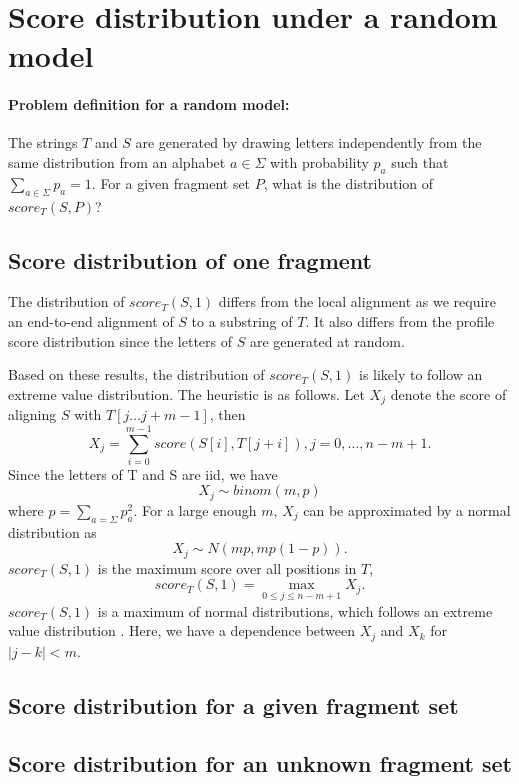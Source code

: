 \section{Score distribution under a random model}
\paragraph{Problem definition for a random model:}
The strings $T$ and $S$ are generated by drawing letters independently
from the same distribution from an alphabet $a \in \Sigma$ with
probability $p_a$ such that $\sum_{a \in \Sigma} p_a = 1$.
For a given fragment set $P$, what is the distribution of $score_T(S,
P)$?


\subsection{Score distribution of one fragment}
The distribution of $score_T(S,1)$ differs from the local alignment as
we require an end-to-end alignment of $S$ to a substring of $T$. It also
differs from the profile score distribution since the letters of $S$ are
generated at random.

Based on these results, the distribution of $score_T(S,1)$ is likely to
follow an extreme value distribution. The heuristic is as follows.
Let $X_j$ denote the score of aligning $S$ with $T[j \dots j+m-1]$, then
\[X_j = \sum_{i=0}^{m-1} score(S[i],T[j+i]), j = 0, \dots, n-m+1.\]
Since the letters of T and S are iid, we have \[X_j \sim binom(m,p)\]
where \( p = \sum_{a=\Sigma} p_a^2\).  For a large enough $m$, $X_j$ can
be approximated by a normal distribution as \[X_j \sim N(mp, mp(1-p)).
\] $score_T(S,1)$ is the maximum score over all positions in $T$,
\[score_T(S,1) = \max_{0 \leq j \leq n-m+1} X_j.\] $score_T(S,1)$ is a
maximum of normal distributions, which follows an extreme value
distribution \cite{kotz2000extreme}.
Here, we have a dependence between $X_j$ and $X_k$ for $|j - k| < m$.


\subsection{Score distribution for a given fragment set}

\subsection{Score distribution for an unknown fragment set}



